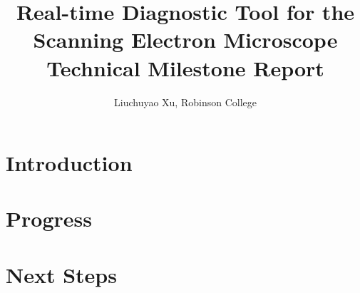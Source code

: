 \documentclass[12pt,a4paper]{article}
\title{Real-time Diagnostic Tool for the Scanning Electron Microscope Technical Milestone Report}
\author{Liuchuyao Xu, Robinson College}
\affil{Supervisor: Dr David Holburn}
\begin{document}
\maketitle

\begin{abstract}

\end{abstract}

\section{Introduction}

\section{Progress}

\section{Next Steps}
\end{document}
